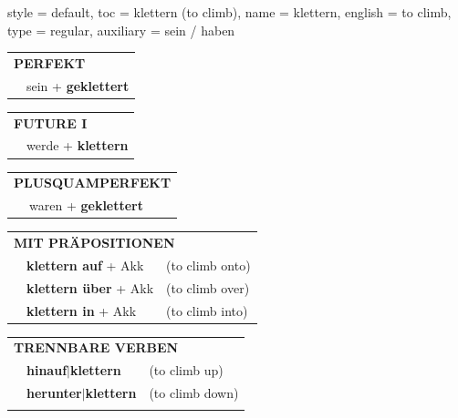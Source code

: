 \begin{verbentry}{
  style = {default},
  toc = {klettern (to climb)},
  name = {klettern},
  english = {to climb},
  type = {regular},
  auxiliary = {sein / haben}
}
 \begin{tabular}{rl}
     \multicolumn{2}{l}{\textbf{PERFEKT}}\\
   & sein + \textbf{geklettert}\\
  \end{tabular}
\hfill
   \begin{tabular}{rl}
    \multicolumn{2}{l}{\textbf{FUTURE I} }\\
   & werde + \textbf{klettern}\\
  \end{tabular}
\hfill
   \begin{tabular}{rl}
      \multicolumn{2}{l}{\textbf{PLUSQUAMPERFEKT}}\\
   & waren + \textbf{geklettert}\\
  \end{tabular}

   \vspace{10pt}

   \begin{tabular}{lll}
      \multicolumn{3}{l}{\textbf{MIT PRÄPOSITIONEN}}\\
& \textbf{klettern auf} + Akk & (to climb onto)\\
& \textbf{klettern über} + Akk & (to climb over)\\
& \textbf{klettern in} + Akk & (to climb into)\\
\end{tabular}
  \hfill
   \begin{tabular}{lll}
      \multicolumn{3}{l}{\textbf{TRENNBARE VERBEN}}\\
 & \textbf{hinauf$|$klettern} & (to climb up)\\
 & \textbf{herunter$|$klettern} & (to climb down)\\
\vspace{10pt}
  \end{tabular}

  \vspace{-5pt}
\end{verbentry}

